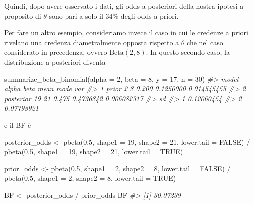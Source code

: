 \documentclass[
  11pt,
  italian,
  a4paper,
  extrafontsizes,onecolumn,openright
  ]{memoir}
\newenvironment{Shaded}{\begin{snugshade}}{\end{snugshade}}
\newcommand{\AttributeTok}[1]{\textcolor[rgb]{0.77,0.63,0.00}{#1}}
\newcommand{\CommentTok}[1]{\textcolor[rgb]{0.56,0.35,0.01}{\textit{#1}}}
\newcommand{\ConstantTok}[1]{\textcolor[rgb]{0.00,0.00,0.00}{#1}}
\newcommand{\DecValTok}[1]{\textcolor[rgb]{0.00,0.00,0.81}{#1}}
\newcommand{\FloatTok}[1]{\textcolor[rgb]{0.00,0.00,0.81}{#1}}
\newcommand{\FunctionTok}[1]{\textcolor[rgb]{0.00,0.00,0.00}{#1}}
\newcommand{\NormalTok}[1]{#1}
\newcommand{\OtherTok}[1]{\textcolor[rgb]{0.56,0.35,0.01}{#1}}
\newcommand{\SpecialCharTok}[1]{\textcolor[rgb]{0.00,0.00,0.00}{#1}}
\begin{document}
Quindi, dopo avere osservato i dati, gli odds a posteriori della nostra ipotesi a proposito di \(\theta\) sono pari a solo il 34\% degli odds a priori.

Per fare un altro esempio, consideriamo invece il caso in cui le credenze a priori rivelano una credenza diametralmente opposta rispetto a \(\theta\) che nel caso considerato in precedenza, ovvero \(\mbox{Beta}(2, 8)\). In questo secondo caso, la distribuzione a posteriori diventa

\begin{Shaded}
\begin{Highlighting}[]
\FunctionTok{summarize\_beta\_binomial}\NormalTok{(}\AttributeTok{alpha =} \DecValTok{2}\NormalTok{, }\AttributeTok{beta =} \DecValTok{8}\NormalTok{, }\AttributeTok{y =} \DecValTok{17}\NormalTok{, }\AttributeTok{n =} \DecValTok{30}\NormalTok{)}
\CommentTok{\#\textgreater{}       model alpha beta  mean      mode         var}
\CommentTok{\#\textgreater{} 1     prior     2    8 0.200 0.1250000 0.014545455}
\CommentTok{\#\textgreater{} 2 posterior    19   21 0.475 0.4736842 0.006082317}
\CommentTok{\#\textgreater{}           sd}
\CommentTok{\#\textgreater{} 1 0.12060454}
\CommentTok{\#\textgreater{} 2 0.07798921}
\end{Highlighting}
\end{Shaded}

\noindent
e il BF è

\begin{Shaded}
\begin{Highlighting}[]
\NormalTok{posterior\_odds }\OtherTok{\textless{}{-}}
  \FunctionTok{pbeta}\NormalTok{(}\FloatTok{0.5}\NormalTok{, }\AttributeTok{shape1 =} \DecValTok{19}\NormalTok{, }\AttributeTok{shape2 =} \DecValTok{21}\NormalTok{, }\AttributeTok{lower.tail =} \ConstantTok{FALSE}\NormalTok{) }\SpecialCharTok{/}
    \FunctionTok{pbeta}\NormalTok{(}\FloatTok{0.5}\NormalTok{, }\AttributeTok{shape1 =} \DecValTok{19}\NormalTok{, }\AttributeTok{shape2 =} \DecValTok{21}\NormalTok{, }\AttributeTok{lower.tail =} \ConstantTok{TRUE}\NormalTok{)}

\NormalTok{prior\_odds }\OtherTok{\textless{}{-}}
  \FunctionTok{pbeta}\NormalTok{(}\FloatTok{0.5}\NormalTok{, }\AttributeTok{shape1 =} \DecValTok{2}\NormalTok{, }\AttributeTok{shape2 =} \DecValTok{8}\NormalTok{, }\AttributeTok{lower.tail =} \ConstantTok{FALSE}\NormalTok{) }\SpecialCharTok{/}
    \FunctionTok{pbeta}\NormalTok{(}\FloatTok{0.5}\NormalTok{, }\AttributeTok{shape1 =} \DecValTok{2}\NormalTok{, }\AttributeTok{shape2 =} \DecValTok{8}\NormalTok{, }\AttributeTok{lower.tail =} \ConstantTok{TRUE}\NormalTok{)}

\NormalTok{BF }\OtherTok{\textless{}{-}}\NormalTok{ posterior\_odds }\SpecialCharTok{/}\NormalTok{ prior\_odds}
\NormalTok{BF}
\CommentTok{\#\textgreater{} [1] 30.07239}
\end{Highlighting}
\end{Shaded}
\end{document}
